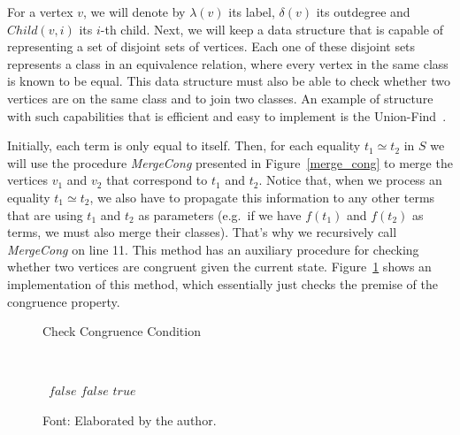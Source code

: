 \begin{figure}[h]
\centering
{}
\end{figure}

For a vertex $v$, we will denote by $\lambda(v)$ its label, $\delta(v)$ its outdegree and $Child(v, i)$ its $i$-th child.
Next, we will keep a data structure that is capable of representing a set of disjoint sets of vertices. Each one of these disjoint sets represents a class in an equivalence relation, where every vertex in the same class is known to be equal. This data structure must also be able to check whether two vertices are on the same class and to join two classes. An example of structure with such capabilities that is efficient and easy to implement is the Union-Find~\cite{union_find}.

Initially, each term is only equal to itself. Then, for each equality $t_{1} \simeq t_{2}$ in $S$ we will use the procedure \textit{MergeCong} presented in Figure~\ref{merge_cong} to merge the vertices $v_{1}$ and $v_{2}$ that correspond to $t_{1}$ and $t_{2}$.
Notice that, when we process an equality $t_{1} \simeq t_{2}$, we also have to propagate this information to any other terms that are using $t_{1}$ and $t_{2}$ as parameters (e.g.~if we have $f(t_{1})$ and $f(t_{2})$ as terms, we must also merge their classes). That's why we recursively call \textit{MergeCong} on line 11.
This method has an auxiliary procedure for checking whether two vertices are congruent given the current state. Figure~\ref{cong_cond} shows an implementation of this method, which essentially just checks the premise of the congruence property.

\begin{figure}[t]
\caption{Check Congruence Condition}~\label{cong_cond}
\begin{algorithmic}[1]
    \State\Return~$false$
  \EndIf
      \State\Return $false$
    \EndIf
  \EndFor
  \State\Return $true$
  \EndFunction
\end{algorithmic}
\caption*{Font: Elaborated by the author.}
\end{figure}


